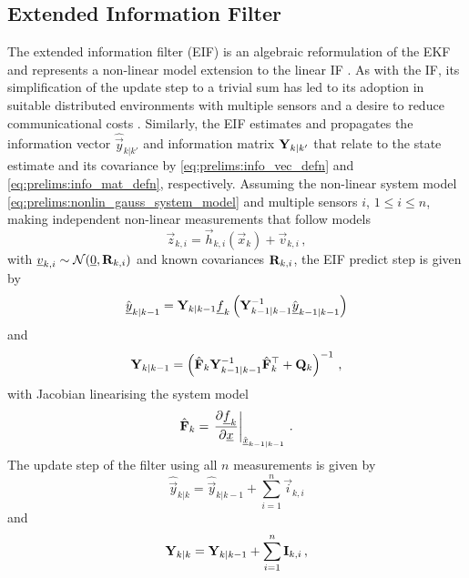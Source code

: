 \subsection{Extended Information Filter}\label{subsec:prelims:eif}
The extended information filter (EIF) is an algebraic reformulation of the EKF and represents a non-linear model extension to the linear IF \cite{mutambaraDecentralizedEstimationControl1998,thrunSimultaneousMappingLocalization2004}. As with the IF, its simplification of the update step to a trivial sum has led to its adoption in suitable distributed environments with multiple sensors and a desire to reduce communicational costs \cite{garritsenUsingExtendedInformation2018}. Similarly, the EIF estimates and propagates the information vector $\hat{\vec{y}}_{k|k'}$ and information matrix ${{\mathbf{Y}}}_{k|k'}$ that relate to the state estimate and its covariance by \eqref{eq:prelims:info_vec_defn} and \eqref{eq:prelims:info_mat_defn}, respectively. Assuming the non-linear system model \eqref{eq:prelims:nonlin_gauss_system_model} and multiple sensors $i$, $1\leq i \leq n$, making independent non-linear measurements that follow models
\begin{equation}
    \vec{z}_{k,i} = \vec{h}_{k,i}\left(\vec{x}_k\right) + \vec{v}_{k,i}\,,
\end{equation}
with ${\underline{v}}_{k,i}\sim\mathcal{N}({\underline{0}},{{\mathbf{R}}}_{k,i})$ and known covariances ${{\mathbf{R}}}_{k,i}$, the EIF predict step is given by
\begin{equation}\label{eq:prelims:eif_info_vec_predict}
    \hat{{\underline{y}}}_{k|k-1} = {{\mathbf{Y}}}_{k|k-1}{\underline{f}}_k\left({{\mathbf{Y}}}_{k-1|k-1}^{-1}\hat{{\underline{y}}}_{k-1|k-1}\right)
\end{equation}
and
\begin{equation}\label{eq:prelims:eif_info_mat_predict}
    {\ensuremath{{\mathbf{Y}}}}_{k|k-1} = \left(\hat{{{\mathbf{F}}}}_k{{\mathbf{Y}}}_{k-1|k-1}^{-1}\hat{{{\mathbf{F}}}}_k^\top + {{\mathbf{Q}}}_k\right)^{-1}\,,
\end{equation}
with Jacobian linearising the system model
\begin{equation}
    \hat{{{\mathbf{F}}}}_k = \left.\frac{\partial {\underline{f}}_k}{\partial {\underline{x}}}\right|_{\hat{{\underline{x}}}_{k-1|k-1}}\,.
\end{equation}
The update step of the filter using all $n$ measurements is given by
\begin{equation}\label{eq:prelims:eif_info_vec_update}
    \hat{\vec{y}}_{k|k} = \hat{\vec{y}}_{k|k-1} + \sum_{i=1}^n\vec{i}_{k,i}
\end{equation}
and
\begin{equation}\label{eq:prelims:eif_info_mat_update}
    {\ensuremath{{\mathbf{Y}}}}_{k|k} = {{\mathbf{Y}}}_{k|k-1} + \sum_{i=1}^n{{\mathbf{I}}}_{k,i}\,,
\end{equation}
